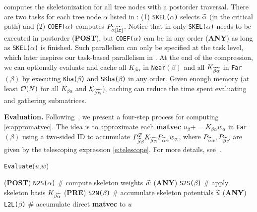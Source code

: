  computes the skeletonization for all tree nodes with a 
postorder traversal.
There are two tasks for each tree node $\alpha$ listed in : 
(1) \texttt{SKEL($\alpha$)} selects ${\widetilde{\alpha}}$ (in the critical path) and
(2) \texttt{COEF($\alpha$)} computes $P_{{\widetilde{\alpha}}[{\widetilde{{\tt l}}}{\widetilde{{\tt r}}}]}$.
Notice that in  only \texttt{SKEL($\alpha$)} needs to be
executed in postorder (\textbf{POST}), but \texttt{COEF($\alpha$)} can be in any
order (\textbf{ANY})
as long as \texttt{SKEL($\alpha$)} is finished. Such parallelism can
only be specified at the task level, which later inspires our task-based
parallelism in .
At the end of the compression, we can optionally evaluate and cache 
all $K_{\beta\alpha}$ in \texttt{Near}$(\beta)$ and all
$K_{{\widetilde{\beta}}{\widetilde{\alpha}}}$ in \texttt{Far}$(\beta)$ by executing \texttt{Kba($\beta$)} 
and \texttt{SKba($\beta$)} in any order.
Given enough memory (at least ${\mathcal O}(N)$ for all 
$K_{\beta\alpha}$ and ${{\mathcal K}}_{{\widetilde{\beta}}{\widetilde{\alpha}}}$), caching 
can reduce the time spent evaluating and gathering submatrices. 

\textbf{Evaluation.}
Following~\cite{march-xiao-biros-fmm-e15}, we present
 a four-step process for computing
\eqref{e:appromatvec}.
The idea is to approximate each \textbf{matvec} $u_{\beta}+=K_{\beta\alpha}w_{\alpha}$
in \texttt{Far}$(\beta)$ using 
a two-sided ID to accumulate
$P_{{\widetilde{\beta}}\beta}^{T}K_{{\widetilde{\beta}}{\widetilde{\alpha}}}P_{{\widetilde{\alpha}}\alpha}w_{\alpha}$,
where $P_{{\widetilde{\alpha}}\alpha}, P_{{\widetilde{\beta}}\beta}$ are given by the
telescoping expression \eqref{e:telescope}. 
For more details, see~\cite{march-xiao-biros-fmm-e15}.

\begin{algorithm}
\caption{{} \texttt{Evaluate}($u$,$w$)}
\begin{algorithmic}[1]
  \STATE (\textbf{POST}) \texttt{N2S($\alpha$)} \# compute skeleton weights ${\widetilde{w}}$
  \STATE (\textbf{ANY}) \texttt{S2S($\beta$)} \# apply skeleton basis $K_{{\widetilde{\beta}}{\widetilde{\alpha}}}$
  \STATE (\textbf{PRE}) \texttt{S2N($\beta$)} \# accumulate skeleton potentials ${\widetilde{u}}$
  \STATE (\textbf{ANY}) \texttt{L2L($\beta$)} \# accumulate direct \textbf{matvec} to $u$
\end{algorithmic}
\label{a:evaluate}
\end{algorithm}

